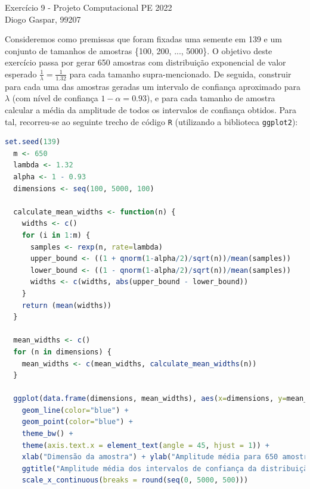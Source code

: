\documentclass[11pt]{article}
\newcommand{\gaspar}{Diogo Gaspar, 99207}
\begin{document}
\begin{center}
{\huge{Exercício 9 - Projeto Computacional PE 2022}} \\
\vspace{1.5mm}
{\large{\gaspar}} \\
\end{center}

Consideremos como premissas que foram fixadas uma semente em 139 e um conjunto de
tamanhos de amostras \{100, 200, ..., 5000\}.
O objetivo deste exercício passa por gerar 650 amostras com distribuição exponencial
de valor esperado $\frac{1}{\lambda} = \frac{1}{1.32}$ para cada tamanho supra-mencionado.
De seguida, construir para cada uma das amostras geradas um intervalo de confiança
aproximado para $\lambda$ (com nível de confiança $1 - \alpha = 0.93$), e para cada
tamanho de amostra calcular a média da amplitude de todos os intervalos de confiança
obtidos. Para tal, recorreu-se ao seguinte trecho de código \texttt{R} (utilizando a biblioteca \texttt{ggplot2}):

\begin{lstlisting}[language=R]
  set.seed(139)
  m <- 650
  lambda <- 1.32
  alpha <- 1 - 0.93
  dimensions <- seq(100, 5000, 100)

  calculate_mean_widths <- function(n) {
    widths <- c()
    for (i in 1:m) {
      samples <- rexp(n, rate=lambda)
      upper_bound <- ((1 + qnorm(1-alpha/2)/sqrt(n))/mean(samples))
      lower_bound <- ((1 - qnorm(1-alpha/2)/sqrt(n))/mean(samples))
      widths <- c(widths, abs(upper_bound - lower_bound))
    }
    return (mean(widths))
  }

  mean_widths <- c()
  for (n in dimensions) {
    mean_widths <- c(mean_widths, calculate_mean_widths(n))
  }

  ggplot(data.frame(dimensions, mean_widths), aes(x=dimensions, y=mean_widths)) +
    geom_line(color="blue") +
    geom_point(color="blue") +
    theme_bw() +
    theme(axis.text.x = element_text(angle = 45, hjust = 1)) +
    xlab("Dimensão da amostra") + ylab("Amplitude média para 650 amostras") +
    ggtitle("Amplitude média dos intervalos de confiança da distribuição exponencial") +
    scale_x_continuous(breaks = round(seq(0, 5000, 500)))
\end{lstlisting}
\end{document}
